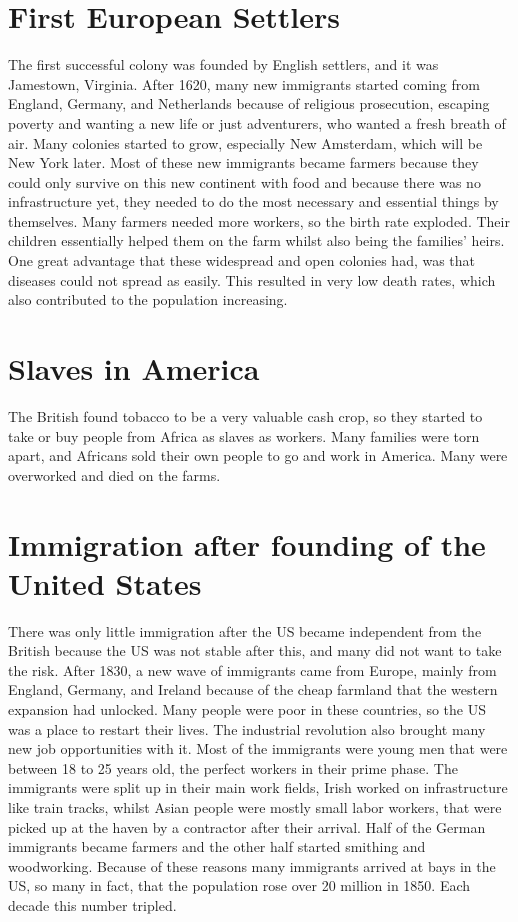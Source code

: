 \documentclass[12pt]{article}
\begin{document}
	\section{First European Settlers}
	The first successful colony was founded by English settlers, and it was Jamestown, Virginia. After 1620, many new immigrants started coming from England, Germany, and Netherlands because of religious prosecution, escaping poverty and wanting a new life or just adventurers, who wanted a fresh breath of air. Many colonies started to grow, especially New Amsterdam, which will be New York later. Most of these new immigrants became farmers because they could only survive on this new continent with food and because there was no infrastructure yet, they needed to do the most necessary and essential things by themselves. Many farmers needed more workers, so the birth rate exploded. Their children essentially helped them on the farm whilst also being the families’ heirs. One great advantage that these widespread and open colonies had, was that diseases could not spread as easily. This resulted in very low death rates, which also contributed to the population increasing. 
	
	\section{Slaves in America}
	The British found tobacco to be a very valuable cash crop, so they started to take or buy people from Africa as slaves as workers. Many families were torn apart, and Africans sold their own people to go and work in America. Many were overworked and died on the farms.
	
	\section{Immigration after founding of the United States}
	There was only little immigration after the US became independent from the British because the US was not stable after this, and many did not want to take the risk. After 1830, a new wave of immigrants came from Europe, mainly from England, Germany, and Ireland because of the cheap farmland that the western expansion had unlocked. Many people were poor in these countries, so the US was a place to restart their lives. The industrial revolution also brought many new job opportunities with it. Most of the immigrants were young men that were between 18 to 25 years old, the perfect workers in their prime phase. The immigrants were split up in their main work fields, Irish worked on infrastructure like train tracks, whilst Asian people were mostly small labor workers, that were picked up at the haven by a contractor after their arrival. Half of the German immigrants became farmers and the other half started smithing and woodworking. Because of these reasons many immigrants arrived at bays in the US, so many in fact, that the population rose over 20 million in 1850. Each decade this number tripled. 
	\newpage
	
\end{document}
